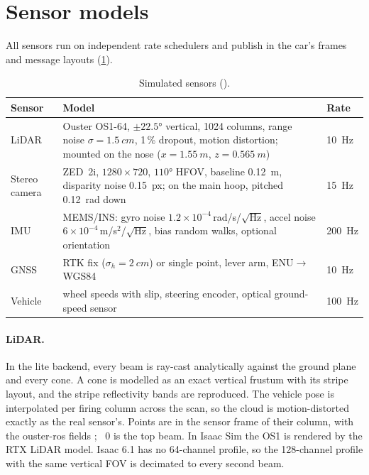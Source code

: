 \documentclass[11pt]{article}
\begin{document}
\section{Sensor models}\label{sec:sensors}
All sensors run on independent rate schedulers and publish in the car's frames and message layouts
(\cref{tab:sensors}).

\begin{table}[t]
\centering\small
\caption{Simulated sensors ().}
\label{tab:sensors}
\begin{tabularx}{\textwidth}{@{}lXl@{}}
\toprule
Sensor & Model & Rate\\
\midrule
LiDAR & Ouster OS1-64, $\pm\ang{22.5}$ vertical, 1024 columns, range noise $\sigma=\SI{1.5}{cm}$, 1\,\% dropout, motion distortion; mounted on the nose ($x=\SI{1.55}{m}$, $z=\SI{0.565}{m}$) & \SI{10}{Hz}\\
Stereo camera & ZED~2i, $1280\times720$, $\ang{110}$ HFOV, baseline \SI{0.12}{m}, disparity noise \SI{0.15}{px}; on the main hoop, pitched \SI{0.12}{rad} down & \SI{15}{Hz}\\
IMU & MEMS/INS: gyro noise $1.2\times10^{-4}$\,rad/s/$\sqrt{\text{Hz}}$, accel noise $6\times10^{-4}$\,m/s$^2$/$\sqrt{\text{Hz}}$, bias random walks, optional orientation & \SI{200}{Hz}\\
GNSS & RTK fix ($\sigma_h=\SI{2}{cm}$) or single point, lever arm, ENU$\to$WGS84 & \SI{10}{Hz}\\
Vehicle & wheel speeds with slip, steering encoder, optical ground-speed sensor & \SI{100}{Hz}\\
\bottomrule
\end{tabularx}
\end{table}

\paragraph{LiDAR.} In the lite backend, every beam is ray-cast analytically against the ground plane and every
cone. A cone is modelled as an exact vertical frustum with its stripe layout, and the stripe reflectivity bands are
reproduced. The vehicle pose is interpolated per firing column across the scan, so the cloud is motion-distorted
exactly as the real sensor's. Points are in the sensor frame of their column, with the ouster-ros fields
; ~0 is the top beam. In Isaac Sim the OS1 is rendered
by the RTX LiDAR model. Isaac 6.1 has no 64-channel profile, so the 128-channel profile with the same vertical FOV
is decimated to every second beam.
\end{document}
